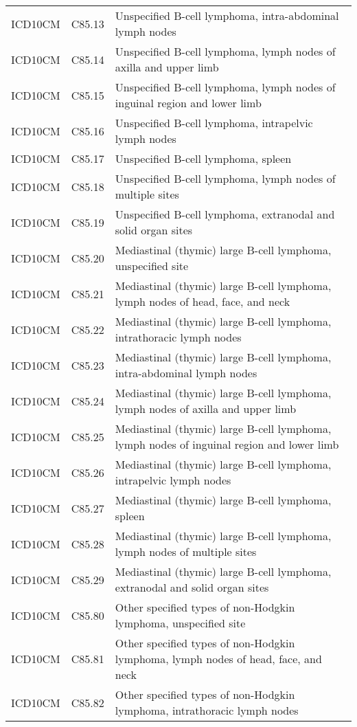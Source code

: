 \begin{longtable}{p{}p{}p{}}
  ICD10CM & C85.13 & Unspecified B-cell lymphoma, intra-abdominal lymph nodes \\ 
  ICD10CM & C85.14 & Unspecified B-cell lymphoma, lymph nodes of axilla and upper limb \\ 
  ICD10CM & C85.15 & Unspecified B-cell lymphoma, lymph nodes of inguinal region and lower limb \\ 
  ICD10CM & C85.16 & Unspecified B-cell lymphoma, intrapelvic lymph nodes \\ 
  ICD10CM & C85.17 & Unspecified B-cell lymphoma, spleen \\ 
  ICD10CM & C85.18 & Unspecified B-cell lymphoma, lymph nodes of multiple sites \\ 
  ICD10CM & C85.19 & Unspecified B-cell lymphoma, extranodal and solid organ sites \\ 
  ICD10CM & C85.20 & Mediastinal (thymic) large B-cell lymphoma, unspecified site \\ 
  ICD10CM & C85.21 & Mediastinal (thymic) large B-cell lymphoma, lymph nodes of head, face, and neck \\ 
  ICD10CM & C85.22 & Mediastinal (thymic) large B-cell lymphoma, intrathoracic lymph nodes \\ 
  ICD10CM & C85.23 & Mediastinal (thymic) large B-cell lymphoma, intra-abdominal lymph nodes \\ 
  ICD10CM & C85.24 & Mediastinal (thymic) large B-cell lymphoma, lymph nodes of axilla and upper limb \\ 
  ICD10CM & C85.25 & Mediastinal (thymic) large B-cell lymphoma, lymph nodes of inguinal region and lower limb \\ 
  ICD10CM & C85.26 & Mediastinal (thymic) large B-cell lymphoma, intrapelvic lymph nodes \\ 
  ICD10CM & C85.27 & Mediastinal (thymic) large B-cell lymphoma, spleen \\ 
  ICD10CM & C85.28 & Mediastinal (thymic) large B-cell lymphoma, lymph nodes of multiple sites \\ 
  ICD10CM & C85.29 & Mediastinal (thymic) large B-cell lymphoma, extranodal and solid organ sites \\ 
  ICD10CM & C85.80 & Other specified types of non-Hodgkin lymphoma, unspecified site \\ 
  ICD10CM & C85.81 & Other specified types of non-Hodgkin lymphoma, lymph nodes of head, face, and neck \\ 
  ICD10CM & C85.82 & Other specified types of non-Hodgkin lymphoma, intrathoracic lymph nodes \\ 

\end{longtable}
